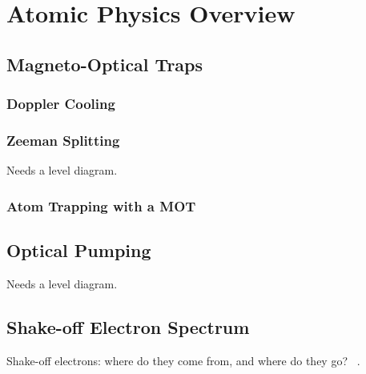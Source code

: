 \clearpage
\chapter{Atomic Physics Overview}
\label{atomicphysics_chapter}
\section{Magneto-Optical Traps}
	\subsection{Doppler Cooling}
	\subsection{Zeeman Splitting}
	Needs a level diagram.
	\subsection{Atom Trapping with a MOT}

\section{Optical Pumping}
Needs a level diagram.


\section{Shake-off Electron Spectrum}
Shake-off electrons:  where do they come from, and where do they go?  ~\cite{Levinger}.


































